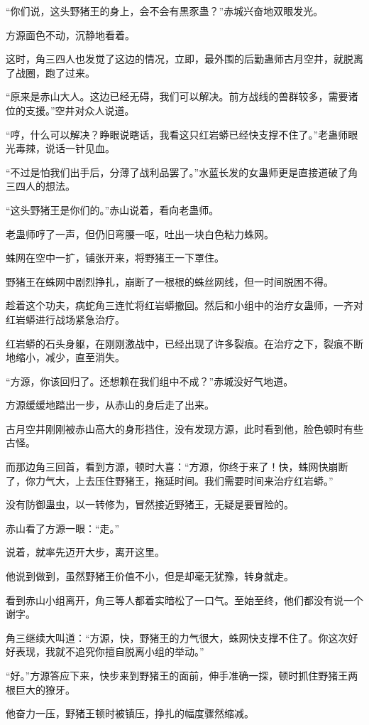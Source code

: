 \begin{this_body}
“你们说，这头野猪王的身上，会不会有黒豕蛊？”赤城兴奋地双眼发光。

方源面色不动，沉静地看着。

这时，角三四人也发觉了这边的情况，立即，最外围的后勤蛊师古月空井，就脱离了战圈，跑了过来。

“原来是赤山大人。这边已经无碍，我们可以解决。前方战线的兽群较多，需要诸位的支援。”空井对众人说道。

“哼，什么可以解决？睁眼说瞎话，我看这只红岩蟒已经快支撑不住了。”老蛊师眼光毒辣，说话一针见血。

“不过是怕我们出手后，分薄了战利品罢了。”水蓝长发的女蛊师更是直接道破了角三四人的想法。

“这头野猪王是你们的。”赤山说着，看向老蛊师。

老蛊师哼了一声，但仍旧弯腰一呕，吐出一块白色粘力蛛网。

蛛网在空中一扩，铺张开来，将野猪王一下罩住。

野猪王在蛛网中剧烈挣扎，崩断了一根根的蛛丝网线，但一时间脱困不得。

趁着这个功夫，病蛇角三连忙将红岩蟒撤回。然后和小组中的治疗女蛊师，一齐对红岩蟒进行战场紧急治疗。

红岩蟒的石头身躯，在刚刚激战中，已经出现了许多裂痕。在治疗之下，裂痕不断地缩小，减少，直至消失。

“方源，你该回归了。还想赖在我们组中不成？”赤城没好气地道。

方源缓缓地踏出一步，从赤山的身后走了出来。

古月空井刚刚被赤山高大的身形挡住，没有发现方源，此时看到他，脸色顿时有些古怪。

而那边角三回首，看到方源，顿时大喜：“方源，你终于来了！快，蛛网快崩断了，你力气大，上去压住野猪王，拖延时间。我们需要时间来治疗红岩蟒。”

没有防御蛊虫，以一转修为，冒然接近野猪王，无疑是要冒险的。

赤山看了方源一眼：“走。”

说着，就率先迈开大步，离开这里。

他说到做到，虽然野猪王价值不小，但是却毫无犹豫，转身就走。

看到赤山小组离开，角三等人都着实暗松了一口气。至始至终，他们都没有说一个谢字。

角三继续大叫道：“方源，快，野猪王的力气很大，蛛网快支撑不住了。你这次好好表现，我就不追究你擅自脱离小组的举动。”

“好。”方源答应下来，快步来到野猪王的面前，伸手准确一探，顿时抓住野猪王两根巨大的獠牙。

他奋力一压，野猪王顿时被镇压，挣扎的幅度骤然缩减。


\end{this_body}
